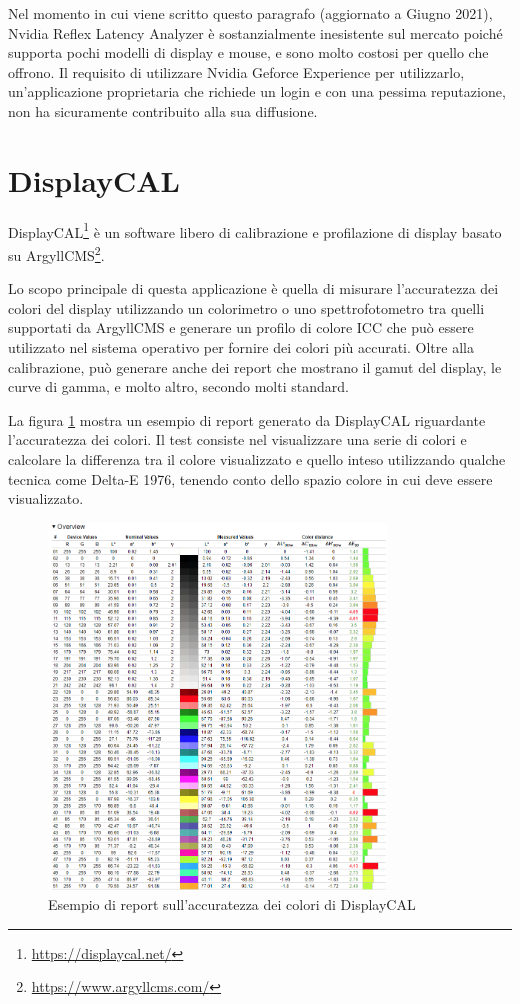 Nel momento in cui viene scritto questo paragrafo (aggiornato a Giugno 2021), Nvidia Reflex Latency Analyzer è sostanzialmente inesistente sul mercato poiché supporta pochi modelli di display e mouse, e sono molto costosi per quello che offrono. Il requisito di utilizzare Nvidia Geforce Experience per utilizzarlo, un'applicazione proprietaria che richiede un login e con una pessima reputazione, non ha sicuramente contribuito alla sua diffusione.

\section{DisplayCAL}
DisplayCAL\footnote{\url{https://displaycal.net/}} è un software libero di calibrazione e profilazione di display basato su ArgyllCMS\footnote{\url{https://www.argyllcms.com/}}.

Lo scopo principale di questa applicazione è quella di misurare l'accuratezza dei colori del display utilizzando un colorimetro o uno spettrofotometro tra quelli supportati da ArgyllCMS e generare un profilo di colore ICC che può essere utilizzato nel sistema operativo per fornire dei colori più accurati. Oltre alla calibrazione, può generare anche dei report che mostrano il gamut del display, le curve di gamma, e molto altro, secondo molti standard.

La figura \ref{fig:displaycal_report_example} mostra un esempio di report generato da DisplayCAL riguardante l'accuratezza dei colori. Il test consiste nel visualizzare una serie di colori e calcolare la differenza tra il colore visualizzato e quello inteso utilizzando qualche tecnica come Delta-E 1976, tenendo conto dello spazio colore in cui deve essere visualizzato.

\begin{figure}[h!]
	\centering
	\includegraphics[width=0.8\textwidth]{StatoDellArte_files/displaycal_report_example.png}
	\caption{Esempio di report sull'accuratezza dei colori di DisplayCAL}
	\label{fig:displaycal_report_example}
\end{figure}

